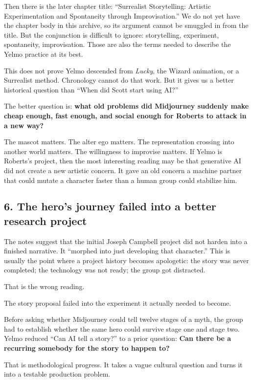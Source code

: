 \documentclass[
]{article}
\begin{document}
Then there is the later chapter title: ``Surrealist Storytelling:
Artistic Experimentation and Spontaneity through Improvisation.'' We do
not yet have the chapter body in this archive, so its argument cannot be
smuggled in from the title. But the conjunction is difficult to ignore:
storytelling, experiment, spontaneity, improvisation. Those are also the
terms needed to describe the Yelmo practice at its best.

This does not prove Yelmo descended from \emph{Lucky}, the Wizard
animation, or a Surrealist method. Chronology cannot do that work. But
it gives us a better historical question than ``When did Scott start
using AI?''

The better question is: \textbf{what old problems did Midjourney
suddenly make cheap enough, fast enough, and social enough for Roberts
to attack in a new way?}

The mascot matters. The alter ego matters. The representation crossing
into another world matters. The willingness to improvise matters. If
Yelmo is Roberts's project, then the most interesting reading may be
that generative AI did not create a new artistic concern. It gave an old
concern a machine partner that could mutate a character faster than a
human group could stabilize him.

\subsection{6. The hero's journey failed into a better research
project}\label{the-heros-journey-failed-into-a-better-research-project}

The notes suggest that the initial Joseph Campbell project did not
harden into a finished narrative. It ``morphed into just developing that
character.'' This is usually the point where a project history becomes
apologetic: the story was never completed; the technology was not ready;
the group got distracted.

That is the wrong reading.

The story proposal failed into the experiment it actually needed to
become.

Before asking whether Midjourney could tell twelve stages of a myth, the
group had to establish whether the same hero could survive stage one and
stage two. Yelmo reduced ``Can AI tell a story?'' to a prior question:
\textbf{Can there be a recurring somebody for the story to happen to?}

That is methodological progress. It takes a vague cultural question and
turns it into a testable production problem.
\end{document}
